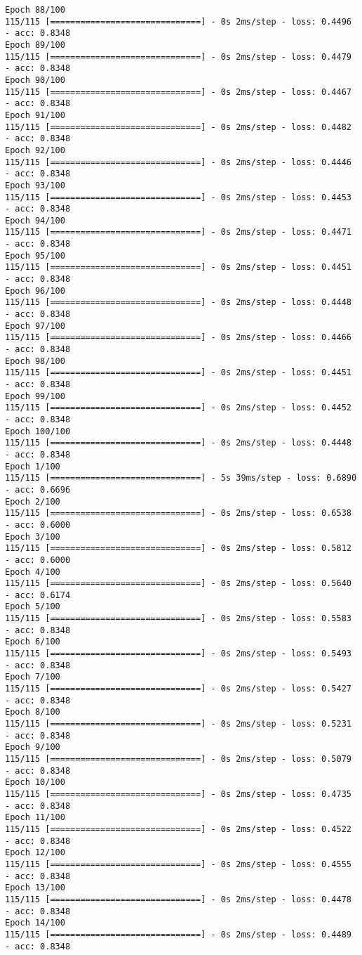 \documentclass[11pt]{article}
\begin{document}
\begin{Verbatim}[commandchars=\\\{\}]
Epoch 88/100
115/115 [==============================] - 0s 2ms/step - loss: 0.4496 - acc: 0.8348
Epoch 89/100
115/115 [==============================] - 0s 2ms/step - loss: 0.4479 - acc: 0.8348
Epoch 90/100
115/115 [==============================] - 0s 2ms/step - loss: 0.4467 - acc: 0.8348
Epoch 91/100
115/115 [==============================] - 0s 2ms/step - loss: 0.4482 - acc: 0.8348
Epoch 92/100
115/115 [==============================] - 0s 2ms/step - loss: 0.4446 - acc: 0.8348
Epoch 93/100
115/115 [==============================] - 0s 2ms/step - loss: 0.4453 - acc: 0.8348
Epoch 94/100
115/115 [==============================] - 0s 2ms/step - loss: 0.4471 - acc: 0.8348
Epoch 95/100
115/115 [==============================] - 0s 2ms/step - loss: 0.4451 - acc: 0.8348
Epoch 96/100
115/115 [==============================] - 0s 2ms/step - loss: 0.4448 - acc: 0.8348
Epoch 97/100
115/115 [==============================] - 0s 2ms/step - loss: 0.4466 - acc: 0.8348
Epoch 98/100
115/115 [==============================] - 0s 2ms/step - loss: 0.4451 - acc: 0.8348
Epoch 99/100
115/115 [==============================] - 0s 2ms/step - loss: 0.4452 - acc: 0.8348
Epoch 100/100
115/115 [==============================] - 0s 2ms/step - loss: 0.4448 - acc: 0.8348
Epoch 1/100
115/115 [==============================] - 5s 39ms/step - loss: 0.6890 - acc: 0.6696
Epoch 2/100
115/115 [==============================] - 0s 2ms/step - loss: 0.6538 - acc: 0.6000
Epoch 3/100
115/115 [==============================] - 0s 2ms/step - loss: 0.5812 - acc: 0.6000
Epoch 4/100
115/115 [==============================] - 0s 2ms/step - loss: 0.5640 - acc: 0.6174
Epoch 5/100
115/115 [==============================] - 0s 2ms/step - loss: 0.5583 - acc: 0.8348
Epoch 6/100
115/115 [==============================] - 0s 2ms/step - loss: 0.5493 - acc: 0.8348
Epoch 7/100
115/115 [==============================] - 0s 2ms/step - loss: 0.5427 - acc: 0.8348
Epoch 8/100
115/115 [==============================] - 0s 2ms/step - loss: 0.5231 - acc: 0.8348
Epoch 9/100
115/115 [==============================] - 0s 2ms/step - loss: 0.5079 - acc: 0.8348
Epoch 10/100
115/115 [==============================] - 0s 2ms/step - loss: 0.4735 - acc: 0.8348
Epoch 11/100
115/115 [==============================] - 0s 2ms/step - loss: 0.4522 - acc: 0.8348
Epoch 12/100
115/115 [==============================] - 0s 2ms/step - loss: 0.4555 - acc: 0.8348
Epoch 13/100
115/115 [==============================] - 0s 2ms/step - loss: 0.4478 - acc: 0.8348
Epoch 14/100
115/115 [==============================] - 0s 2ms/step - loss: 0.4489 - acc: 0.8348

\end{Verbatim}
\end{document}
